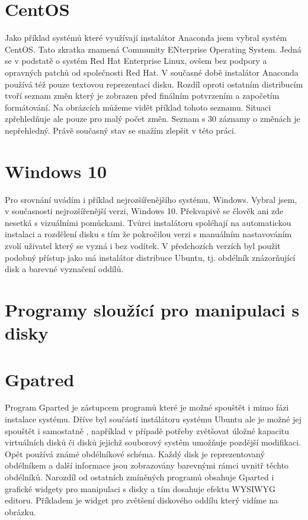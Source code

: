 \documentclass{article}
\begin{document}
\section{CentOS}

Jako příklad systémů které využívají instalátor Anaconda jsem vybral systém CentOS. Tato zkratka znamená Community ENterprise Operating System. Jedná se v podstatě o systém Red Hat Enterprise 
Linux, ovšem bez podpory a opravných patchů od společnosti Red Hat. V současné době instalátor Anaconda používá též pouze textovou reprezentaci disku. Rozdíl oproti ostatním distribucím tvoří 
seznam změn který je zobrazen před finálním potvrzením a započetím formátování. Na obrázcích můžeme vidět příklad tohoto seznamu. Situaci zpřehledňuje ale pouze pro malý počet změn. Seznam s 30 záznamy o změnách je nepřehledný. Právě současný stav se snažím zlepšit v této práci.

\section{Windows 10}

Pro srovnání uvádím i příklad nejrozšířenějšího systému, Windows. Vybral jsem, v současnosti nejrozšířenější verzi, Windows 10. Překvapivě se člověk ani zde nesetká s vizuálními pomůckami.
Tvůrci instalátoru spoléhají na automatickou instalaci a rozdělení disku s tím že pokročilou verzi s manuálním nastavováním zvolí uživatel který se vyzná i bez vodítek. V předchozích verzích
byl použit podobný přístup jako má instalátor distribuce Ubuntu, tj. obdélník znázorňující disk a barevné vyznačení oddílů.
\section{Programy sloužící pro manipulaci s disky}

\section{Gpatred}

Program Gparted je zástupcem programů které je možné spouštět i mimo fázi instalace systému. Dříve byl součástí instálátoru systému Ubuntu ale je možné jej spouštět i samostatně , například 
v případě potřeby zvětšovat úložné kapacitu virtuálních disků či disků jejichž souborový systém umožňuje pozdější modifikaci. Opět používá známé obdélníkové schéma. Každý disk je reprezentovaný obdélníkem a další informace jsou zobrazovány barevnými rámci uvnitř těchto obdélníků. Narozdíl od ostatních zmíněných programů obsahuje Gparted i grafické widgety pro manipulaci s disky 
a tím dosahuje efektu WYSIWYG editoru. Příkladem je widget pro zvětšení diskového oddílu který vidíme na obrázku.
\end{document}
